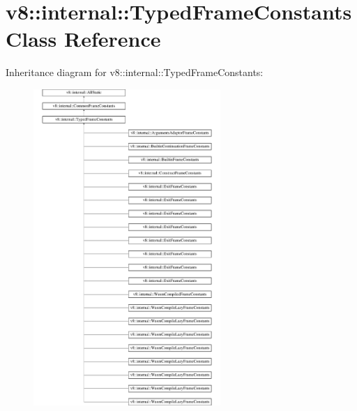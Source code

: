 \hypertarget{classv8_1_1internal_1_1TypedFrameConstants}{}\section{v8\+:\+:internal\+:\+:Typed\+Frame\+Constants Class Reference}
\label{classv8_1_1internal_1_1TypedFrameConstants}
Inheritance diagram for v8\+:\+:internal\+:\+:Typed\+Frame\+Constants\+:\begin{figure}[H]
\begin{center}
\leavevmode
\includegraphics[height=12.000000cm]{classv8_1_1internal_1_1TypedFrameConstants}
\end{center}
\end{figure}
